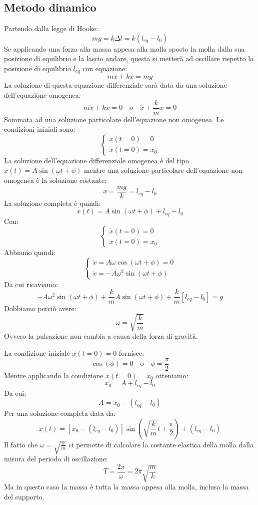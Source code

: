 \documentclass[a4paper,12pt]{article}
\begin{document}
\subsection{Metodo dinamico}
Partendo dalla legge di Hooke:
$$
mg = k \Delta l = k(l_{eq} - l_0)
$$
Se applicando una forza alla massa appesa alla molla sposto la molla dalla sua posizione di equilibrio e la lascio
andare, questa si metterà ad oscillare rispetto la posizione di equilibrio $l_{eq}$ con equazione:
$$
m\ddot{x} + kx = mg
$$
La soluzione di questa equazione differenziale sarà data da una soluzione dell'equazione
omogenea:
$$
m\ddot{x} + kx = 0 \quad \text{o} \quad \ddot{x} + \frac{k}{m}x = 0
$$
Sommata ad una soluzione particolare dell'equazione non omogenea.
Le condizioni iniziali sono:
$$
\begin{cases}
    \dot{x}(t=0)=0 \\
    x(t=0)=x_0
\end{cases}
$$
La soluzione dell'equazione differenziale omogenea è del tipo $x(t) = A \sin(\omega t+\phi)$
mentre una soluzione particolare dell'equazione non omogenea è la soluzione costante:
$$
x = \frac{mg}{k} = l_{eq} - l_0
$$
La soluzione completa è quindi:
$$
x(t) = A \sin(\omega t+\phi) + l_{eq} - l_0
$$
Con:
$$
\begin{cases}
    \dot{x}(t=0)=0 \\
    x(t=0)=x_0
\end{cases}
$$
Abbiamo quindi:
$$
\begin{cases}
    \dot{x} = A \omega \cos(\omega t + \phi) = 0 \\
    \ddot{x} = -A \omega^2 \sin(\omega t + \phi)
\end{cases}
$$
Da cui ricaviamo:
$$
-A \omega^2 \sin(\omega t + \phi) + \frac{k}{m} A \sin(\omega t + \phi) + \frac{k}{m}[l_{eq} - l_0] = g
$$
Dobbiamo perciò avere:
$$
\omega = \sqrt{\frac{k}{m}}
$$
Ovvero la pulsazione non cambia a causa della forza di gravità.

La condizione iniziale $\dot{x}(t=0)=0$ fornisce:
$$
\cos(\phi) = 0 \quad \text{o} \quad \phi = \frac{\pi}{2} 
$$
Mentre applicando la condizione $x(t=0)=x_0$ otteniamo:
$$
x_0 = A + l_{eq} - l_0
$$
Da cui:
$$
A = x_0 - (l_{eq} - l_0)
$$
Per una soluzione completa data da:
$$
x(t) = [x_0 - (l_{eq} - l_0)]\sin(\sqrt{\frac{k}{m}}t+\frac{\pi}{2}) + (l_{eq} - l_0) 
$$
Il fatto che $\omega = \sqrt{\frac{k}{m}}$ ci permette di calcolare la costante elastica della molla dalla
misura del periodo di oscillazione:
$$
T = \frac{2\pi}{\omega} = 2\pi \sqrt{\frac{m}{k}}
$$
Ma in questo caso la massa è tutta la massa appesa alla molla, inclusa la massa del supporto.
\end{document}
